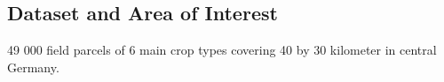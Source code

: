 \documentclass[a0]{tumposter}
\begin{document}
\begin{minipage}[t]{.65\textwidth}
\begin{minipage}[t]{.5\textwidth}
	\subsection{Dataset and Area of Interest}
	
	49 000 field parcels of 6 main crop types covering 40 by 30 kilometer in central Germany.
	

		
	
	\end{minipage}

\end{minipage}
\hfill
\end{document}
